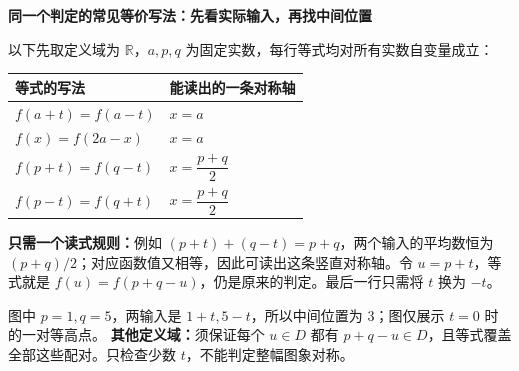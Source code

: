 \begin{statementbox}
\textbf{同一个判定的常见等价写法：先看实际输入，再找中间位置}


以下先取定义域为 $\mathbb R$，$a,p,q$ 为固定实数，每行等式均对所有实数自变量成立：
\begin{center}
\renewcommand{\arraystretch}{1.4}
\begin{tabular}{p{.56\linewidth}|p{.28\linewidth}}
等式的写法 & 能读出的一条对称轴\\\hline
$f(a+t)=f(a-t)$ & $x=a$\\
$f(x)=f(2a-x)$ & $x=a$\\
$f(p+t)=f(q-t)$ & $x=\dfrac{p+q}{2}$\\
$f(p-t)=f(q+t)$ & $x=\dfrac{p+q}{2}$
\end{tabular}
\end{center}
\textbf{只需一个读式规则：}例如 $(p+t)+(q-t)=p+q$，两个输入的平均数恒为 $(p+q)/2$；对应函数值又相等，因此可读出这条竖直对称轴。令 $u=p+t$，等式就是 $f(u)=f(p+q-u)$，仍是原来的判定。最后一行只需将 $t$ 换为 $-t$。

图中 $p=1,q=5$，两输入是 $1+t,5-t$，所以中间位置为 $3$；图仅展示 $t=0$ 时的一对等高点。
\textbf{其他定义域：}须保证每个 $u\in D$ 都有 $p+q-u\in D$，且等式覆盖全部这些配对。只检查少数 $t$，不能判定整幅图象对称。
\end{statementbox}
